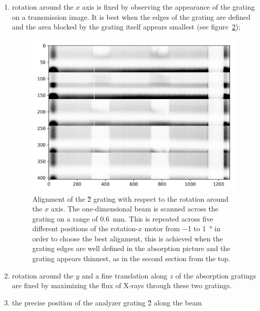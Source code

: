 \begin{enumerate}
\begin{figure}[htb]
{        with finer steps in order to achieve a high precision in the alignment.}
            \label{fig:alignment-z}
        \end{figure}
    \item rotation around the $x$ axis is fixed by observing the appearance
        of the grating on a transmission image. It is best when the edges of
        the grating are defined and the area blocked by the grating itself
        appears smallest (see figure~\ref{fig:alignment-x});
        \begin{figure}[htb]
            \centering
            \includegraphics[width=\textwidth]{gfx/alignment-rot-x.png}
            \caption[Alignment of \G2 around the $x$ rotation axis.]{Alignment of the \G2 grating with respect to the rotation
            around the $x$ axis. The one-dimensional beam is scanned across the
            grating on a range of \SI{0.6}{\milli\metre}. This is repeated across
            five different positions of the rotation-$x$ motor from \num{-1} to
            \SI{+1}{\degree} in order to choose the
            best alignment, this is achieved when the grating edges are well defined in
            the absorption picture and the grating appears thinnest, as in the second
        section from the top.}
            \label{fig:alignment-x}
        \end{figure}
    \item rotation around the $y$ and a fine translation along $z$ of the
        absorption gratings are fixed by maximizing the flux of X-rays
        through these two gratings.
    \item the precise position of the analyzer grating \G2 along the beam

\end{enumerate}
